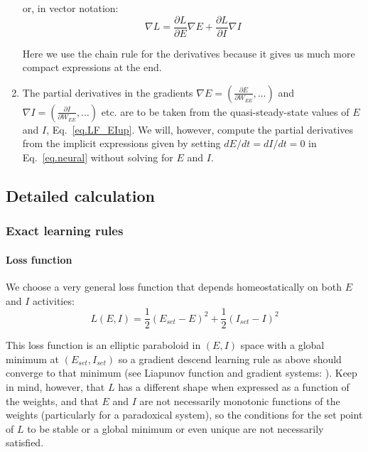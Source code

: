 \documentclass[twocolumn]{article}
\newcommand{\set}{\mathit{set}}
\begin{document}
\begin{enumerate}
\noindent or, in vector notation:
\begin{equation}
\nabla L = \frac{\partial L}{\partial E} \nabla E + \frac{\partial L}{\partial I} \nabla I
\label{eq.LF_partial}
\end{equation}

\noindent Here we use the chain rule for the derivatives because it gives us much more compact expressions at the end.

\item The partial derivatives in the gradients $\displaystyle \nabla E = \left(\frac{\partial E}{\partial W_{EE}}, \ldots \right)$ and $\displaystyle \nabla I = \left( \frac{\partial I}{\partial W_{EE}}, \ldots \right)$ etc. are to be taken from the quasi-steady-state values of $E$ and $I$, Eq.\ \ref{eq.LF_EIup}. We will, however, compute the partial derivatives from the implicit expressions given by setting $dE/dt=dI/dt=0$ in Eq.\ \ref{eq.neural} without solving for $E$ and $I$.
\end{enumerate}


\subsection{Detailed calculation}

\subsubsection{Exact learning rules}

\paragraph{Loss function}

We choose a very general loss function that depends homeostatically on both $E$ and $I$ activities:
\begin{equation}
L(E,I) = \frac{1}{2}(E_{set} - E)^2 + \frac{1}{2}(I_{set} - I)^2
\label{eq.LF_energy}
\end{equation}

\noindent This loss function is an elliptic paraboloid in $(E,I)$ space with a global minimum at $(E_{\set},I_{\set})$ so a gradient descend learning rule as above should converge to that minimum (see Liapunov function and gradient systems: \cite[Section 1.1B]{Wiggins1996}\cite[Sections 9.3 and 9.4]{Hirsch1974}\cite[Section 7.2]{Strogatz2018}). Keep in mind, however, that $L$ has a different shape when expressed as a function of the weights, and that $E$ and $I$ are not necessarily monotonic functions of the weights (particularly for a paradoxical system), so the conditions for the set point of $L$ to be stable or a global minimum or even unique are not necessarily satisfied.
\end{document}

